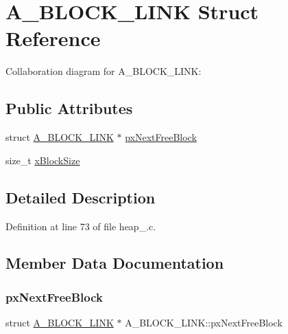 \hypertarget{struct_a___b_l_o_c_k___l_i_n_k}{}\section{A\+\_\+\+B\+L\+O\+C\+K\+\_\+\+L\+I\+NK Struct Reference}
\label{struct_a___b_l_o_c_k___l_i_n_k}


Collaboration diagram for A\+\_\+\+B\+L\+O\+C\+K\+\_\+\+L\+I\+NK\+:
\subsection*{Public Attributes}
\begin{DoxyCompactItemize}
\item 
struct \hyperlink{struct_a___b_l_o_c_k___l_i_n_k}{A\+\_\+\+B\+L\+O\+C\+K\+\_\+\+L\+I\+NK} $\ast$ \hyperlink{struct_a___b_l_o_c_k___l_i_n_k_aaef1b26e95b0b7b7ebffc91fa6ce874f}{px\+Next\+Free\+Block}
\item 
size\+\_\+t \hyperlink{struct_a___b_l_o_c_k___l_i_n_k_ad5dcf5df03d8be6186c567be9e2c657b}{x\+Block\+Size}
\end{DoxyCompactItemize}


\subsection{Detailed Description}


Definition at line 73 of file heap\+\_.\+c.



\subsection{Member Data Documentation}
\mbox{\label{struct_a___b_l_o_c_k___l_i_n_k_aaef1b26e95b0b7b7ebffc91fa6ce874f}} 
\subsubsection{\texorpdfstring{px\+Next\+Free\+Block}{pxNextFreeBlock}}
{\footnotesize\ttfamily struct \hyperlink{struct_a___b_l_o_c_k___l_i_n_k}{A\+\_\+\+B\+L\+O\+C\+K\+\_\+\+L\+I\+NK} $\ast$ A\+\_\+\+B\+L\+O\+C\+K\+\_\+\+L\+I\+N\+K\+::px\+Next\+Free\+Block}



